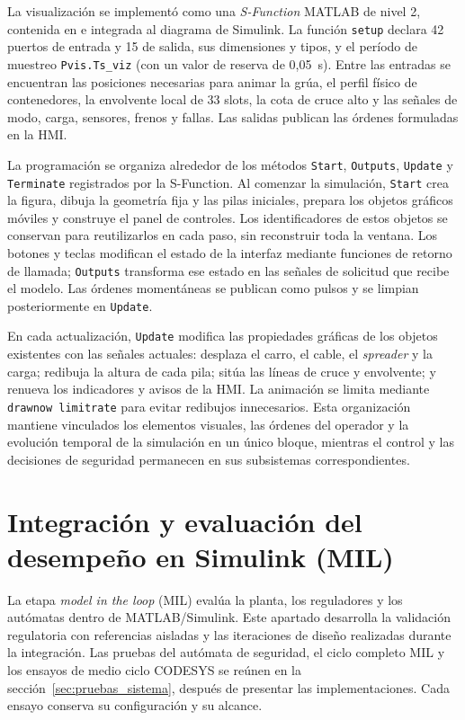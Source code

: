 \documentclass[a4paper,10pt,onecolumn,journal]{ieeeconf}
\numberwithin{equation}{section}
\begin{document}
La visualización se implementó como una \textit{S-Function} MATLAB de nivel 2, contenida en  e integrada al diagrama de Simulink. La función \texttt{setup} declara 42 puertos de entrada y 15 de salida, sus dimensiones y tipos, y el período de muestreo \texttt{Pvis.Ts\_viz} (con un valor de reserva de 0,05~s). Entre las entradas se encuentran las posiciones necesarias para animar la grúa, el perfil físico de contenedores, la envolvente local de 33 slots, la cota de cruce alto y las señales de modo, carga, sensores, frenos y fallas. Las salidas publican las órdenes formuladas en la HMI.

La programación se organiza alrededor de los métodos \texttt{Start}, \texttt{Outputs}, \texttt{Update} y \texttt{Terminate} registrados por la S-Function. Al comenzar la simulación, \texttt{Start} crea la figura, dibuja la geometría fija y las pilas iniciales, prepara los objetos gráficos móviles y construye el panel de controles. Los identificadores de estos objetos se conservan para reutilizarlos en cada paso, sin reconstruir toda la ventana. Los botones y teclas modifican el estado de la interfaz mediante funciones de retorno de llamada; \texttt{Outputs} transforma ese estado en las señales de solicitud que recibe el modelo. Las órdenes momentáneas se publican como pulsos y se limpian posteriormente en \texttt{Update}.

En cada actualización, \texttt{Update} modifica las propiedades gráficas de los objetos existentes con las señales actuales: desplaza el carro, el cable, el \textit{spreader} y la carga; redibuja la altura de cada pila; sitúa las líneas de cruce y envolvente; y renueva los indicadores y avisos de la HMI. La animación se limita mediante \texttt{drawnow limitrate} para evitar redibujos innecesarios. Esta organización mantiene vinculados los elementos visuales, las órdenes del operador y la evolución temporal de la simulación en un único bloque, mientras el control y las decisiones de seguridad permanecen en sus subsistemas correspondientes.

\par
{}
\section{Integración y evaluación del desempeño en Simulink (MIL)}
\label{sec:integracion_p1}
La etapa \textit{model in the loop} (MIL) evalúa la planta, los reguladores y los autómatas dentro de MATLAB/Simulink. Este apartado desarrolla la validación regulatoria con referencias aisladas y las iteraciones de diseño realizadas durante la integración. Las pruebas del autómata de seguridad, el ciclo completo MIL y los ensayos de medio ciclo CODESYS se reúnen en la sección~\ref{sec:pruebas_sistema}, después de presentar las implementaciones. Cada ensayo conserva su configuración y su alcance.
\end{document}
